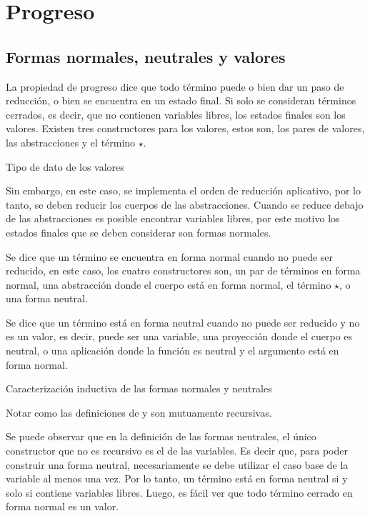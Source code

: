 \section{Progreso}

\subsection{Formas normales, neutrales y valores}

La propiedad de progreso dice que todo término puede o bien dar un paso de reducción, o bien se encuentra en un estado final.
Si solo se consideran términos cerrados, es decir, que no contienen variables libres, los estados finales son los valores.
Existen tres constructores para los valores, estos son, los pares de valores, las abstracciones y el término $\star$.

\begin{codigo}
	Tipo de dato de los valores
\end{codigo}

Sin embargo, en este caso, se implementa el orden de reducción aplicativo, por lo tanto, se deben reducir los cuerpos de las abstracciones.
Cuando se reduce debajo de las abstracciones es posible encontrar variables libres, por este motivo los estados finales que se deben considerar son formas normales.

Se dice que un término se encuentra en forma normal cuando no puede ser reducido, en este caso, los cuatro constructores son, un par de términos en forma normal, una abstracción donde el cuerpo está en forma normal, el término $\star$, o una forma neutral.

Se dice que un término está en forma neutral cuando no puede ser reducido y no es un valor, es decir, puede ser una variable, una proyección donde el cuerpo es neutral, o una aplicación donde la función es neutral y el argumento está en forma normal.

\begin{codigo}
	Caracterización inductiva de las formas normales y neutrales
\end{codigo}

Notar como las definiciones de \const{$\Uparrow$} y \const{$\Downarrow$} son mutuamente recursivas.

Se puede observar que en la definición de las formas neutrales, el único constructor que no es recursivo es el de las variables.
Es decir que, para poder construir una forma neutral, necesariamente se debe utilizar el caso base de la variable al menos una vez.
Por lo tanto, un término está en forma neutral si y solo si contiene variables libres.
Luego, es fácil ver que todo término cerrado en forma normal es un valor.

